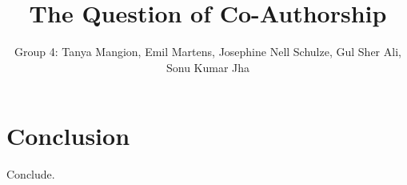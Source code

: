 \documentclass{template}
\begin{document}
\title{The Question of Co-Authorship}
\author{Group 4: Tanya Mangion, Emil Martens, Josephine Nell Schulze, Gul Sher Ali, Sonu Kumar Jha}







\section{Conclusion}
Conclude.

\nocite{*} %
\printbibliography
\pagebreak


\end{document}
